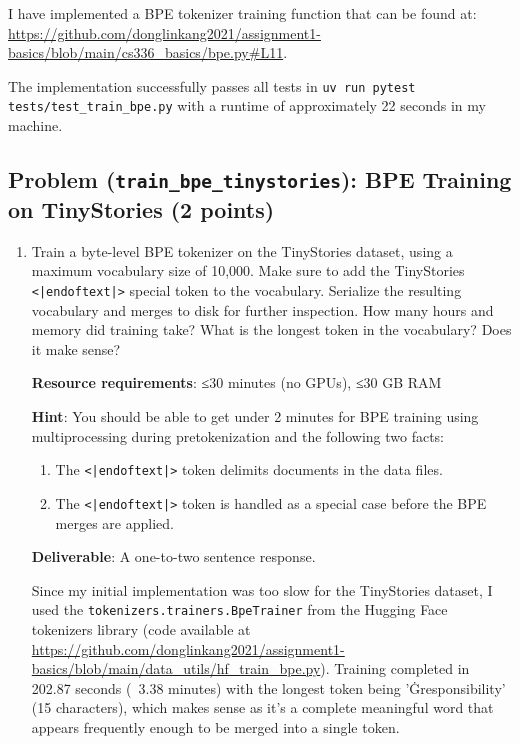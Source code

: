 \documentclass{article}
\newcounter{problem}
\newcommand{\problem}[2]{
    \stepcounter{problem}
    \subsection{Problem (\texttt{#1}): #2}
    \vspace{-1.5em} %
    \noindent
}
\begin{document}
\begin{answer}
I have implemented a BPE tokenizer training function that can be found at: \url{https://github.com/donglinkang2021/assignment1-basics/blob/main/cs336_basics/bpe.py#L11}.

The implementation successfully passes all tests in \lstinline{uv run pytest tests/test_train_bpe.py} with a runtime of approximately 22 seconds in my machine.
\end{answer}

\problem{train\_bpe\_tinystories}{BPE Training on TinyStories (2 points)}

\begin{enumerate}[label=(\alph*)]
    \item Train a byte-level BPE tokenizer on the TinyStories dataset, using a maximum vocabulary size of 10,000. Make sure to add the TinyStories \lstinline{<|endoftext|>} special token to the vocabulary. Serialize the resulting vocabulary and merges to disk for further inspection. How many hours and memory did training take? What is the longest token in the vocabulary? Does it make sense?
    
    \textbf{Resource requirements}: ≤30 minutes (no GPUs), ≤30 GB RAM
    
    \textbf{Hint}: You should be able to get under 2 minutes for BPE training using multiprocessing during pretokenization and the following two facts:
    \begin{enumerate}[label=(\alph*)]
        \item The \lstinline{<|endoftext|>} token delimits documents in the data files.
        \item The \lstinline{<|endoftext|>} token is handled as a special case before the BPE merges are applied.
    \end{enumerate}
    
    \textbf{Deliverable}: A one-to-two sentence response.
    
    \begin{answer}
    Since my initial implementation was too slow for the TinyStories dataset, I used the \lstinline{tokenizers.trainers.BpeTrainer} from the Hugging Face tokenizers library (code available at \url{https://github.com/donglinkang2021/assignment1-basics/blob/main/data_utils/hf_train_bpe.py}). Training completed in 202.87 seconds (~3.38 minutes) with the longest token being 'Ġresponsibility' (15 characters), which makes sense as it's a complete meaningful word that appears frequently enough to be merged into a single token.
    \end{answer}
    

\end{enumerate}
\end{document}
